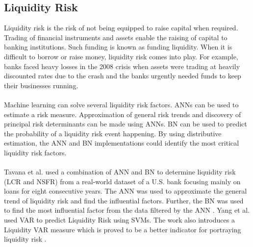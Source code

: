 \documentclass[a4paper, 12pt]{article}
\begin{document}
\subsection{Liquidity Risk}
\noindent Liquidity risk is the risk of not being equipped to raise capital when required. Trading of financial instruments and assets enable the raising of capital to banking institutions. Such funding is known as funding liquidity. When it is difficult to borrow or raise money, liquidity risk comes into play. For example, banks faced heavy losses in the 2008 crisis when assets were trading at heavily discounted rates due to the crash and the banks urgently needed funds to keep their businesses running.
\\
\\
\noindent Machine learning can solve several liquidity risk factors. ANNs can be used to estimate a risk measure. Approximation of general risk trends and discovery of principal risk determinants can be made using ANNs. BN can be used to predict the probability of a liquidity risk event happening.  By using distributive estimation, the ANN and BN implementations could identify the most critical liquidity risk factors.
\\
\\
\noindent Tavana et al. used a combination of ANN and BN to determine liquidity risk (LCR and NSFR) from a real-world dataset of a U.S. bank focusing mainly on loans for eight consecutive years. The ANN was used to approximate the general trend of liquidity risk and find the influential factors. Further, the BN was used to find the most influential factor from the data filtered by the ANN \cite{tavana2018artificial}. Yang et al. used VAR to predict Liquidity Risk using SVMs. The work also introduces a Liquidity VAR measure which is proved to be a better indicator for portraying liquidity risk \cite{yang2009density}.

\vskip 0.2in
\end{document}
